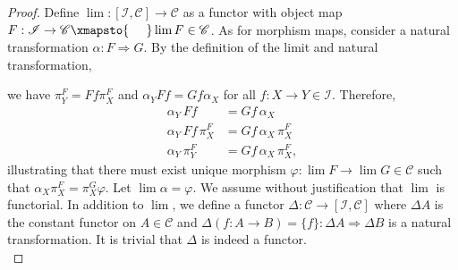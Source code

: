 \documentclass[ 12pt ]{article}
\begin{document}
\begin{enumerate}
		\begin{proof}
			Define $\lim : [\mathscr{I}, \mathscr{C}] \to \mathscr{C}$ as a functor with object map $F : \mathscr{I} \to \mathscr{C} \xmapsto{\;\;\;\;\;} \lim F \in \mathscr{C}$. As for morphism maps, consider a natural transformation $\alpha : F \Rightarrow G$. By the definition of the limit and natural transformation,
			\begin{center}
			\end{center}
			we have $\pi_Y^F = Ff \pi_X^F$ and $\alpha_Y Ff = Gf \alpha_X$ for all $f : X \to Y \in \mathscr{I}$. Therefore,
			\begin{align*}
				\alpha_Y\, Ff &= Gf\, \alpha_X \\
				\alpha_Y\, Ff\, \pi_X^F &= Gf\, \alpha_X\, \pi_X^F \\
				\alpha_Y\, \pi_Y^F &= Gf\, \alpha_X\, \pi_X^F,
			\end{align*}
			illustrating that there must exist unique morphism $\varphi : \lim F \to \lim G \in \mathscr{C}$ such that $\alpha_X \pi_X^F = \pi_X^G \varphi$. Let $\lim \alpha = \varphi$. We assume without justification that $\lim$ is functorial. In addition to $\lim$, we define a functor $\Delta : \mathscr{C} \to [\mathscr{I}, \mathscr{C}]$ where $\Delta A$ is the constant functor on $A \in \mathscr{C}$ and $\Delta (f : A \to B) = \{ f \} : \Delta A \Rightarrow \Delta B$ is a natural transformation. It is trivial that $\Delta$ is indeed a functor. \\


\end{proof}
\end{enumerate}
\end{document}
